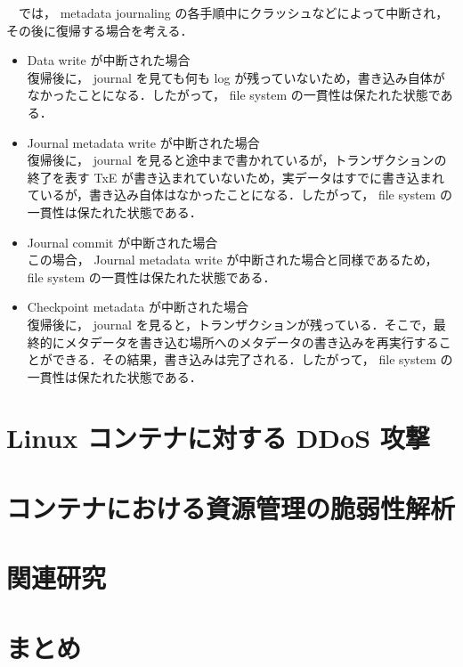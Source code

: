 \documentclass[graduation-thesis]{jsarticle}
\begin{document}
　では， metadata journaling の各手順中にクラッシュなどによって中断され，その後に復帰する場合を考える．\\
\begin{itemize}
	\item{Data write が中断された場合}\\
	復帰後に， journal を見ても何も log が残っていないため，書き込み自体がなかったことになる．したがって， file system の一貫性は保たれた状態である．\\
	\item{Journal metadata write が中断された場合}\\
	復帰後に， journal を見ると途中まで書かれているが，トランザクションの終了を表す TxE が書き込まれていないため，実データはすでに書き込まれているが，書き込み自体はなかったことになる．したがって， file system の一貫性は保たれた状態である．\\
	\item{Journal commit が中断された場合}\\
	この場合， Journal metadata write が中断された場合と同様であるため， file system の一貫性は保たれた状態である．\\
	\item{Checkpoint metadata が中断された場合}\\
	復帰後に， journal を見ると，トランザクションが残っている．そこで，最終的にメタデータを書き込む場所へのメタデータの書き込みを再実行することができる．その結果，書き込みは完了される．したがって， file system の一貫性は保たれた状態である．\\
\end{itemize}

\clearpage
\section{Linux コンテナに対する DDoS 攻撃}
\label{sec:DDoS}

\clearpage
\section{コンテナにおける資源管理の脆弱性解析}
\label{sec:analysis}

\clearpage
\section{関連研究}
\label{sec:relative}

\clearpage
\section{まとめ}
\label{sec:conclusion}
\end{document}
